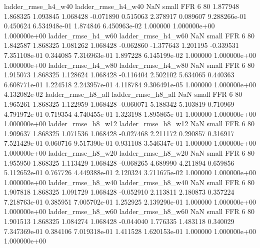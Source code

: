       ladder_rmse_h4_w40       ladder_rmse_h4_w40                   NaN      small      FFR                 6 80 1.877948       1.868325 1.093845       1.068428   -0.071890      0.515063      2.378917     0.089607   9.288266e-01  0.450624 6.534948e-01     1.874846   6.450963e-02            1.000000    1.000000e+00        1.000000e+00
      ladder_rmse_h4_w60       ladder_rmse_h4_w60                   NaN      small      FFR                 6 80 1.842587       1.868325 1.081262       1.068428   -0.062860     -1.377643      1.201195    -0.339531   7.351108e-01  0.344085 7.316963e-01     1.897228   6.145199e-02            1.000000    1.000000e+00        1.000000e+00
      ladder_rmse_h4_w80       ladder_rmse_h4_w80                   NaN      small      FFR                 6 80 1.915073       1.868325 1.128624       1.068428   -0.116404      2.502102      5.634065     0.440363   6.608771e-01  1.224518 2.243957e-01     4.118784   9.306491e-05            1.000000    1.000000e+00        4.132082e-02
      ladder_rmse_h8_all       ladder_rmse_h8_all                   NaN      small      FFR                 6 80 1.965261       1.868325 1.122959       1.068428   -0.060071      5.188342      5.103819     0.710969   4.791972e-01  0.719354 4.740455e-01     1.323198   1.895865e-01            1.000000    1.000000e+00        1.000000e+00
      ladder_rmse_h8_w12       ladder_rmse_h8_w12                   NaN      small      FFR                 6 80 1.909637       1.868325 1.071536       1.068428   -0.027468      2.211172      0.290857     0.316917   7.521429e-01  0.060716 9.517390e-01     0.931108   3.546347e-01            1.000000    1.000000e+00        1.000000e+00
      ladder_rmse_h8_w20       ladder_rmse_h8_w20                   NaN      small      FFR                 6 80 1.955950       1.868325 1.113429       1.068428   -0.068265      4.689990      4.211894     0.659856   5.112652e-01  0.767726 4.449388e-01     2.120324   3.711675e-02            1.000000    1.000000e+00        1.000000e+00
      ladder_rmse_h8_w40       ladder_rmse_h8_w40                   NaN      small      FFR                 6 80 1.907818       1.868325 1.091729       1.068428   -0.052910      2.113811      2.180873     0.357224   7.218763e-01  0.385951 7.005702e-01     1.252925   2.139290e-01            1.000000    1.000000e+00        1.000000e+00
      ladder_rmse_h8_w60       ladder_rmse_h8_w60                   NaN      small      FFR                 6 80 1.901513       1.868325 1.084274       1.068428   -0.044040      1.776335      1.483118     0.340029   7.347369e-01  0.384106 7.019318e-01     1.411528   1.620153e-01            1.000000    1.000000e+00        1.000000e+00
